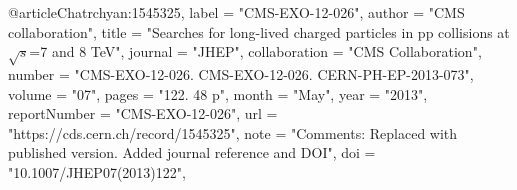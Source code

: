 @article{Chatrchyan:1545325,
      label          = "CMS-EXO-12-026",
      author        = "{CMS collaboration}",
      title         = "{Searches for long-lived charged particles in pp
                       collisions at $\sqrt{s}$=7 and 8 TeV}",
      journal       = "JHEP",
      collaboration = "CMS Collaboration",
      number        = "CMS-EXO-12-026. CMS-EXO-12-026. CERN-PH-EP-2013-073",
      volume        = "07",
      pages         = "122. 48 p",
      month         = "May",
      year          = "2013",
      reportNumber  = "CMS-EXO-12-026",
      url           = "https://cds.cern.ch/record/1545325",
      note          = "Comments: Replaced with published version. Added journal
                       reference and DOI",
      doi           = "10.1007/JHEP07(2013)122",
}

